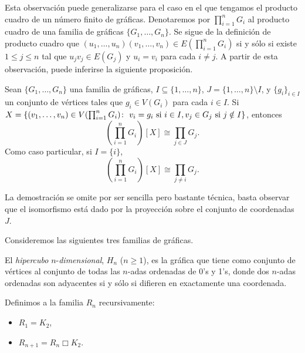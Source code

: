 Esta observaci\' on puede generalizarse para el caso en el que tengamos el producto cuadro de un n\' umero finito de
gr\' aficas. Denotaremos por $\prod_{i = 1}^n G_i$ al producto cuadro de una familia de gr\' aficas $\{ G_1, \dots,
G_n \}$. Se sigue de la definici\'on de producto cuadro que $(u_1, \dots, u_n)(v_1, \dots, v_n) \in E \left( \prod_{i
= 1}^n G_i \right)$ si y s\' olo si existe  $1 \le j \le n$ tal que $u_j v_j \in E(G_j)$  y  $u_i = v_i$ para cada $i
\ne j$. A partir de esta observaci\'on, puede inferirse la siguiente proposici\'on.

\begin{proposicion}
    \label{prodcart}
    Sean $\{ G_1, \dots, G_n \}$ una familia de gr\' aficas, $I \subseteq \{ 1, \dots, n \}$, $J = \{ 1, \dots, n \}
    \setminus I$, y $\{ g_i \}_{i \in I}$ un conjunto de v\' ertices tales que $g_i \in V(G_i)$ para cada $i \in I$.
    Si $X = \left\{ (v_1, \dots, v_n) \in V(\prod_{i=1}^n G_i) \colon\ v_i = g_i \textnormal{ si } i \in I, v_j \in
    G_j \textnormal{ si } j \notin I \right\}$, entonces $$\left( \prod_{i=1}^n G_i \right) [ X ] \cong \prod_{j \in
    J} G_j.$$   Como caso particular, si $I =  \{ i \}$, $$\left( \prod_{i=1}^n G_i \right) [ X ] \cong \prod_{j \ne
    i} G_j.$$
\end{proposicion}

La demostraci\' on se omite por ser sencilla pero bastante t\' ecnica, basta observar que el isomorfismo est\' a dado
por la proyecci\' on sobre el conjunto de coordenadas $J$.

Consideremos las siguientes tres familias de gr\'aficas.

\begin{definicion}
    El \emph{hipercubo} $n$-\emph{dimensional}, $H_n$ ($n \ge 1$), es la gr\'afica que tiene como
    conjunto de v\'ertices al conjunto de todas las $n$-adas ordenadas de 0's y 1's, donde dos $n$-adas ordenadas son
    adyacentes si y s\'olo si difieren en exactamente una coordenada.
\end{definicion}

\begin{definicion}
    Definimos a la familia $R_n$ recursivamente:
    \begin{itemize}
        \item $R_1  =  K_2$,
        \item $R_{n+1}  =  R_n \Box K_2$.
    \end{itemize}
\end{definicion}

